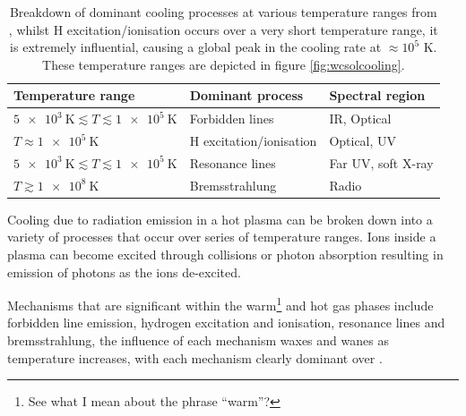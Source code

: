 \begin{table}[h]
  \centering
  \begin{tabular}{lll}
  \\ \hline 
  \textbf{Temperature range} & \textbf{Dominant process} & \textbf{Spectral region} \\ \hline
  $\SI{5e3}{\kelvin} \lesssim T \lesssim \SI{1e5}{\kelvin} $ & Forbidden lines & IR, Optical \\
  $T \approx \SI{1e5}{\kelvin}$ & H excitation/ionisation & Optical, UV \\
  $\SI{5e3}{\kelvin} \lesssim T \lesssim \SI{1e5}{\kelvin} $ & Resonance lines & Far UV, soft X-ray \\
  $T \gtrsim \SI{1e8}{\kelvin} $ & Bremsstrahlung & Radio \\ \hline
  \end{tabular}
  \caption[Cooling processes at various temperature ranges]{Breakdown of dominant cooling processes at various temperature ranges from \cite{dysonPhysicsInterstellarMedium2021}, whilst H excitation/ionisation occurs over a very short temperature range, it is extremely influential, causing a global peak in the cooling rate at $\approx 10^5$ \si{\kelvin}. These temperature ranges are depicted in figure \ref{fig:wcsolcooling}.}
  \label{tab:coolprocess}
  \end{table}


Cooling due to radiation emission in a hot plasma can be broken down into a variety of processes that occur over series of temperature ranges.
Ions inside a plasma can become excited through collisions or photon absorption resulting in emission of photons as the ions de-excited. 

Mechanisms that are significant within the warm\footnote{See what I mean about the phrase ``warm''?} and hot gas phases include forbidden line emission, hydrogen excitation and ionisation, resonance lines and bremsstrahlung, the influence of each mechanism waxes and wanes as temperature increases, with each mechanism clearly dominant over \parencite{dysonPhysicsInterstellarMedium2021}.



